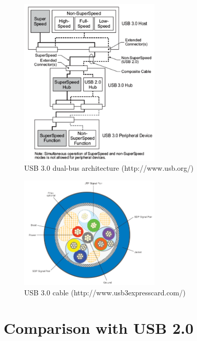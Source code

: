 \documentclass[a4paper,12pt]{report}
\begin{document}
\begin{figure}[H]
\begin{center}
\includegraphics[width=0.6\textwidth]{usb30_architecture}
\caption{USB 3.0 dual-bus architecture (http://www.usb.org/)}
\label{fig:usb30_architecture}
\end{center}
\end{figure}

\begin{figure}[H]
\begin{center}
\includegraphics[width=0.6\textwidth]{usb30_cable}
\caption{USB 3.0 cable (http://www.usb3expresscard.com/)}
\label{fig:usb30_cable}
\end{center}
\end{figure}

\section{Comparison with USB 2.0} \label{sec:comparison_with_usb_2.0}
\end{document}
